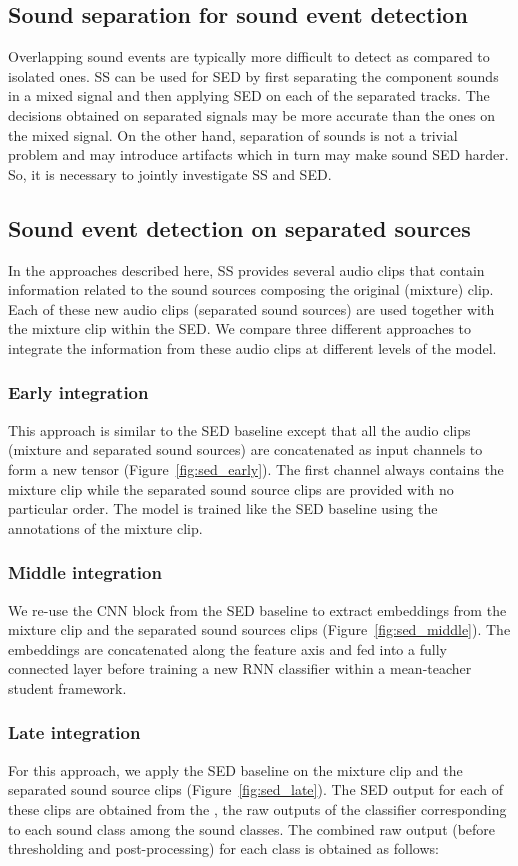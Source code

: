 \documentclass{article}
\begin{document}
\begin{sloppy}
\label{sec:sed_ss}
\subsection{Sound separation for sound event detection}
Overlapping sound events are typically more difficult to detect as compared to isolated ones.
SS can be used for SED by first separating the component sounds in a mixed signal and then applying SED on each of the separated tracks. The decisions obtained on separated signals may be more accurate than the ones on the mixed signal. On the other hand, separation of sounds is not a trivial problem and may introduce artifacts which in turn may make sound SED harder. So, it is necessary to jointly investigate SS and SED.

\subsection{Sound event detection on separated sources}

In the approaches described here, SS provides several audio clips that contain information related to the sound sources composing the original (mixture) clip. Each of these new audio clips (separated sound sources) are used together with the mixture clip within the SED. We compare three different approaches to integrate the information from these audio clips at different levels of the model.

\subsubsection{Early integration}
This approach is similar to the SED baseline except that all the audio clips (mixture and separated sound sources) are concatenated as input channels to form a new tensor (Figure~\ref{fig:sed_early}). The first channel always contains the mixture clip while the  separated sound source clips are provided with no particular order. The model is trained like the SED baseline using the annotations of the mixture clip. \subsubsection{Middle integration}
We re-use the CNN block from the SED baseline to extract embeddings from the mixture clip and the separated sound sources clips (Figure~\ref{fig:sed_middle}). The embeddings are concatenated along the feature axis and fed into a fully connected layer before training a new RNN classifier within a mean-teacher student framework. \subsubsection{Late integration}
For this approach, we apply the SED baseline on the mixture clip and the separated sound source clips (Figure~\ref{fig:sed_late}). The SED output for each of these clips are obtained from the , the raw outputs of the classifier corresponding to each sound class  among the  sound classes. The combined raw output (before thresholding and post-processing) for each class  is obtained as follows:


\end{sloppy}
\end{document}
